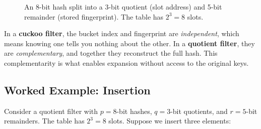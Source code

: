 \begin{figure}[H]
  \centering
  \caption{An 8-bit hash split into a 3-bit quotient (slot address) and 
           5-bit remainder (stored fingerprint). The table has 
           $2^3 = 8$ slots.}
  \label{fig:quotienting}
\end{figure}

\begin{insightbox}
In a \textbf{cuckoo filter}, the bucket index and fingerprint are 
\emph{independent}, which means knowing one tells you nothing about the other. 
In a \textbf{quotient filter}, they are \emph{complementary}, and 
together they reconstruct the full hash. This complementarity is what 
enables expansion without access to the original keys.
\end{insightbox}

\subsection{Worked Example: Insertion}

Consider a quotient filter with $p = 8$-bit hashes, $q = 3$-bit 
quotients, and $r = 5$-bit remainders. The table has $2^3 = 8$ slots. 
Suppose we insert three elements:

